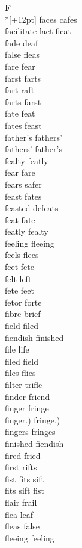 \vspace{14pt}
\noindent\textbf{\Large F}\\*[+12pt]
faces cafes\\
facilitate laetificat\\
fade deaf\\
false fleas\\
fare fear\\
farst farts\\
fart raft\\
farts farst\\
fate feat\\
fates feast\\
father's fathers'\\
fathers' father's\\
fealty featly\\
fear fare\\
fears safer\\
feast fates\\
feasted defeats\\
feat fate\\
featly fealty\\
feeling fleeing\\
feels flees\\
feet fete\\
felt left\\
fete feet\\
fetor forte\\
fibre brief\\
field filed\\
fiendish finished\\
file life\\
filed field\\
files flies\\
filter trifle\\
finder friend\\
finger fringe\\
finger.) fringe.)\\
fingers fringes\\
finished fiendish\\
fired fried\\
first rifts\\
fist fits sift\\
fits sift fist\\
flair frail\\
flea leaf\\
fleas false\\
fleeing feeling\\
